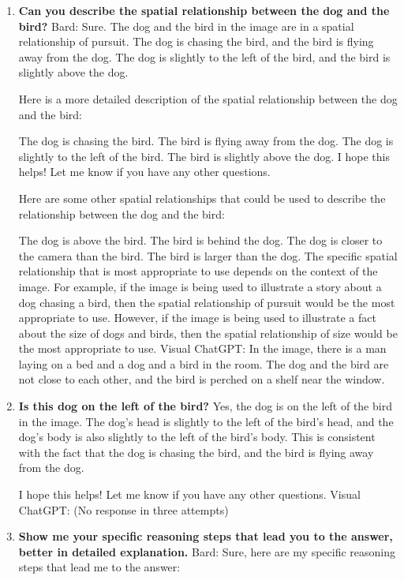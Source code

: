     \begin{enumerate}
        \item \textbf{Can you describe the spatial relationship between the dog and the bird?}
        \subitem Bard: 
        Sure. The dog and the bird in the image are in a spatial relationship of pursuit. The dog is chasing the bird, and the bird is flying away from the dog. The dog is slightly to the left of the bird, and the bird is slightly above the dog.

        Here is a more detailed description of the spatial relationship between the dog and the bird:

        The dog is chasing the bird.
        The bird is flying away from the dog.
        The dog is slightly to the left of the bird.
        The bird is slightly above the dog.
        I hope this helps! Let me know if you have any other questions.

        Here are some other spatial relationships that could be used to describe the relationship between the dog and the bird:

        The dog is above the bird.
        The bird is behind the dog.
        The dog is closer to the camera than the bird.
        The bird is larger than the dog.
        The specific spatial relationship that is most appropriate to use depends on the context of the image. For example, if the image is being used to illustrate a story about a dog chasing a bird, then the spatial relationship of pursuit would be the most appropriate to use. However, if the image is being used to illustrate a fact about the size of dogs and birds, then the spatial relationship of size would be the most appropriate to use.
        \subitem Visual ChatGPT: In the image, there is a man laying on a bed and a dog and a bird in the room. The dog and the bird are not close to each other, and the bird is perched on a shelf near the window.
        \item \textbf{Is this dog on the left of the bird?}
        \subitem Yes, the dog is on the left of the bird in the image. The dog's head is slightly to the left of the bird's head, and the dog's body is also slightly to the left of the bird's body. This is consistent with the fact that the dog is chasing the bird, and the bird is flying away from the dog.

        I hope this helps! Let me know if you have any other questions.
        \subitem Visual ChatGPT: (No response in three attempts)
        \item \textbf{Show me your specific reasoning steps that lead you to the answer, better in detailed explanation.}
        \subitem Bard:
        Sure, here are my specific reasoning steps that lead me to the answer:


\end{enumerate}
